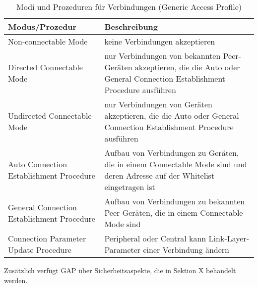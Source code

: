 \begin{table}
    \begin{tabularx}{\textwidth}{|p{4.5cm}|X|}
    \hline
    \textbf{Modus/Prozedur} & \textbf{Beschreibung} \\
    \hline
    Non-connectable Mode & keine Verbindungen akzeptieren \\
    \hline
    Directed Connectable Mode & nur Verbindungen von bekannten Peer-Geräten akzeptieren, die die Auto oder General Connection Establishment Procedure ausführen \\
    \hline
    Undirected Connectable Mode & nur Verbindungen von Geräten akzeptieren, die die Auto oder General Connection Establishment Procedure ausführen \\
    \hline
    Auto Connection Establishment Procedure & Aufbau von Verbindungen zu Geräten, die in einem Connectable Mode sind und deren Adresse auf der Whitelist eingetragen ist \\
    \hline
    General Connection Establishment Procedure & Aufbau von Verbindungen zu bekannten Peer-Geräten, die in einem Connectable Mode sind \\
    \hline
    Connection Parameter Update Procedure & Peripheral oder Central kann Link-Layer-Parameter einer Verbindung ändern \\
    \hline
    \end{tabularx}
    \caption{Modi und Prozeduren für Verbindungen (Generic Access Profile)}
\end{table}

Zusätzlich verfügt GAP über Sicherheitsaspekte, die in Sektion X behandelt werden.
